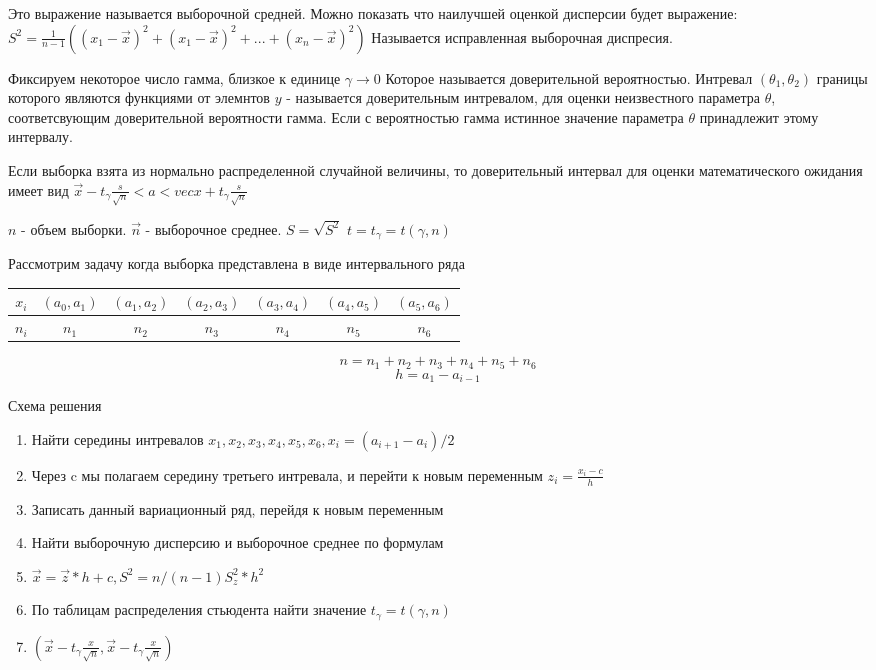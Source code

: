 \documentclass[a4paper]{article}
\begin{document}
Это выражение называется выборочной средней. Можно показать что наилучшей оценкой дисперсии будет выражение: 
$ S^2 = \frac{1}{n-1}((x_1-\vec{x})^2+ (x_1-\vec{x})^2 + ... + (x_n-\vec{x})^2)$
Называется исправленная выборочная диспресия. 

Фиксируем некоторое число гамма, близкое к единице
$\gamma \rightarrow 0$
Которое называется доверительной вероятностью. 
Интревал $(\theta_1, \theta_2)$ границы которого являются функциями от элемнтов $y$ - называется доверительным интревалом, для оценки неизвестного параметра $\theta$, соответсвующим доверительной вероятности гамма. Если с вероятностью гамма истинное значение параметра $\theta$ принадлежит этому интервалу. 

Если выборка взята из нормально распределенной случайной величины, то доверительный интервал для оценки математического ожидания имеет вид $\vec{x}-t_{\gamma}\frac{s}{\sqrt{n}}<a<vec{x}+t_{\gamma}\frac{s}{\sqrt{n}}$  

$n$ - объем выборки.
$\vec{n}$ - выборочное среднее. 
$S = \sqrt{S^2}$
$t = t_{\gamma} = t(\gamma, n)$

Рассмотрим задачу когда выборка представлена в виде интервального ряда
\begin{table}[H]
    \centering
    \begin{tabular}{|c|c|c|c|c|c|c|}
        \hline
        $x_i$ & $(a_0, a_1)$ & $(a_1, a_2)$ & $(a_2, a_3)$ & $(a_3, a_4)$ & $(a_4, a_5)$ & $(a_5, a_6)$\\
        \hline
        $n_i$ & $n_1$ & $n_2$ & $n_3$ & $n_4$ & $n_5$ & $n_6$ \\
        \hline
    \end{tabular}
\end{table}

$$ n = n_1 + n_2 + n_3 + n_4 + n_5 + n_6 $$
$$ h = a_1 - a_{i-1}$$

Схема решения

\begin{enumerate}
    \item Найти середины интревалов $x_1, x_2, x_3, x_4, x_5, x_6, x_i = (a_{i+1} - a_i) / 2$
    \item Через c мы полагаем середину третьего интревала, и перейти к новым переменным $z_i = \frac{x_i - c}{h}$
    \item Записать данный вариационный ряд, перейдя к новым переменным
    \item Найти выборочную дисперсию и выборочное среднее по формулам
    \item $\vec{x} = \vec{z} * h + c, S^2 = n/(n-1) S_z^2*h^2$
    \item По таблицам распределения стьюдента найти значение $t_{\gamma} = t(\gamma, n)$
    \item $(\vec{x} - t_{\gamma} \frac{x}{\sqrt{n}}, \vec{x} - t_{\gamma} \frac{x}{\sqrt{n}})$
\end{enumerate}
\end{document}
